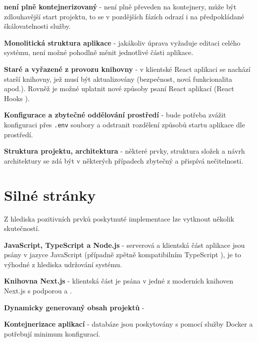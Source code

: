 \begin{ul}
   \item
   \textbf{ není plně kontejnerizovaný} -  není plně převeden na kontejnery, může být zdlouhavější start projektu, to se v pozdějších fázích odrazí i na předpokládané škálovatelnosti služby.
   \item
   \textbf{Monolitická struktura aplikace} - jakákoliv úprava vyžaduje editaci celého systému, není možné pohodlně měnit jednotlivé části aplikace.
   \item
   \textbf{Staré a vyřazené z provozu knihovny} - v klientské React aplikaci se nachází starší knihovny, jež musí být aktualizovány (bezpečnost, nová funkcionalita apod.).
   Rovněž je možné uplatnit nové způsoby psaní React aplikací (React Hooks ).
   \item
   \textbf{Konfigurace a zbytečné oddělování prostředí} - bude potřeba zvážit konfiguraci přes \texttt{.env} soubory  a odstranit rozdělení způsobů startu aplikace dle prostředí.
   \item
   \textbf{Struktura projektu, architektura} - některé prvky, struktura složek a návrh architektury se zdá být v některých případech zbytečný a přispívá nečitelnosti.
\end{ul}



\section{Silné stránky}
Z hlediska pozitivních prvků poskytnuté implementace lze vytknout několik skutečností.

\begin{ul}
   \item
   \textbf{JavaScript, TypeScript a Node.js} - serverová a klientská část aplikace jsou psány v jazyce JavaScript (případně zpětně kompatibilním TypeScript ), je to výhodné z hlediska udržování systému.
   \item
   \textbf{Knihovna Next.js} - klientská část je psána v jedné z moderních knihoven Next.js s podporou  a  .
   \item
   \textbf{Dynamicky generovaný obsah projektů} -
   \item
   \textbf{Kontejnerizace aplikací} - databáze jsou poskytovány s pomocí služby Docker  a potřebují minimum konfigurací.
\end{ul}




